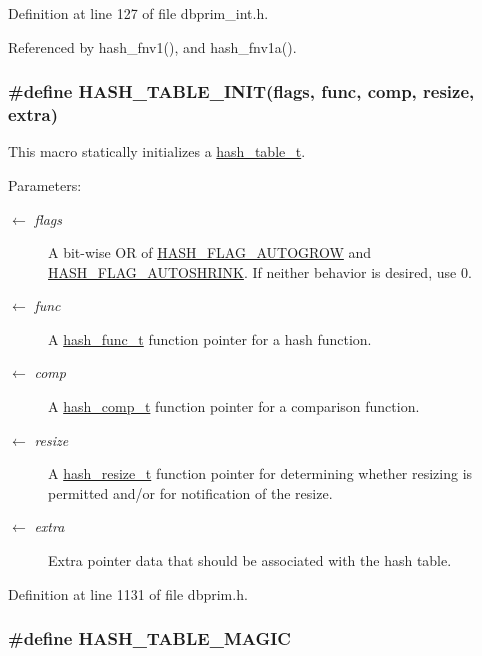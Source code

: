 Definition at line 127 of file dbprim\_\-int.h.

Referenced by hash\_\-fnv1(), and hash\_\-fnv1a().\hypertarget{group__dbprim__hash_ga25}{
\subsubsection[HASH\_\-TABLE\_\-INIT]{\setlength{\rightskip}{0pt plus 5cm}\#define HASH\_\-TABLE\_\-INIT(flags, func, comp, resize, extra)}}
\label{group__dbprim__hash_ga25}


This macro statically initializes a \hyperlink{group__dbprim__hash_ga1}{hash\_\-table\_\-t}.

\begin{Desc}
\item[Parameters:]
\begin{description}
\item[\mbox{$\leftarrow$} {\em flags}]A bit-wise OR of \hyperlink{group__dbprim__hash_ga22}{HASH\_\-FLAG\_\-AUTOGROW} and \hyperlink{group__dbprim__hash_ga23}{HASH\_\-FLAG\_\-AUTOSHRINK}. If neither behavior is desired, use 0. \item[\mbox{$\leftarrow$} {\em func}]A \hyperlink{group__dbprim__hash_ga4}{hash\_\-func\_\-t} function pointer for a hash function. \item[\mbox{$\leftarrow$} {\em comp}]A \hyperlink{group__dbprim__hash_ga5}{hash\_\-comp\_\-t} function pointer for a comparison function. \item[\mbox{$\leftarrow$} {\em resize}]A \hyperlink{group__dbprim__hash_ga6}{hash\_\-resize\_\-t} function pointer for determining whether resizing is permitted and/or for notification of the resize. \item[\mbox{$\leftarrow$} {\em extra}]Extra pointer data that should be associated with the hash table.\end{description}
\end{Desc}


Definition at line 1131 of file dbprim.h.\hypertarget{group__dbprim__hash_ga21}{
\subsubsection[HASH\_\-TABLE\_\-MAGIC]{\setlength{\rightskip}{0pt plus 5cm}\#define HASH\_\-TABLE\_\-MAGIC}}
\label{group__dbprim__hash_ga21}


